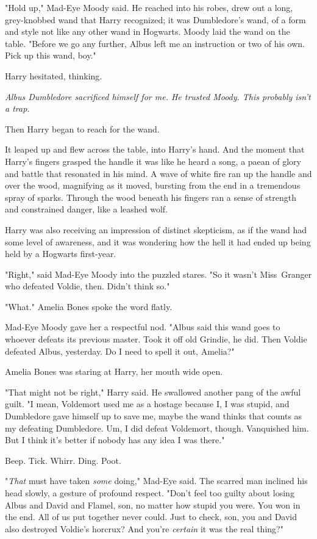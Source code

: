 "Hold up," Mad-Eye Moody said. He reached into his robes, drew out a long,
grey-knobbed wand that Harry recognized; it was Dumbledore's wand, of a form
and style not like any other wand in Hogwarts. Moody laid the wand on the
table. "Before we go any further, Albus left me an instruction or two of his
own. Pick up this wand, boy."

Harry hesitated, thinking.

\emph{Albus Dumbledore sacrificed himself for me. He trusted Moody. This
probably isn't a trap.}

Then Harry began to reach for the wand.

It leaped up and flew across the table, into Harry's hand. And the moment that
Harry's fingers grasped the handle it was like he heard a song, a paean of
glory and battle that resonated in his mind. A wave of white fire ran up the
handle and over the wood, magnifying as it moved, bursting from the end in a
tremendous spray of sparks. Through the wood beneath his fingers ran a sense of
strength and constrained danger, like a leashed wolf.

Harry was also receiving an impression of distinct skepticism, as if the wand
had some level of awareness, and it was wondering how the hell it had ended up
being held by a Hogwarts first-year.

"Right," said Mad-Eye Moody into the puzzled stares. "So it wasn't Miss~Granger
who defeated Voldie, then. Didn't think so."

"What." Amelia Bones spoke the word flatly.

Mad-Eye Moody gave her a respectful nod. "Albus said this wand goes to whoever
defeats its previous master. Took it off old Grindie, he did. Then Voldie
defeated Albus, yesterday. Do I need to spell it out, Amelia?"

Amelia Bones was staring at Harry, her mouth wide open.

"That might not be right," Harry said. He swallowed another pang of the awful
guilt. "I mean, Voldemort used me as a hostage because I, I was stupid, and
Dumbledore gave himself up to save me, maybe the wand thinks that counts as my
defeating Dumbledore. Um, I did defeat Voldemort, though. Vanquished him. But I
think it's better if nobody has any idea I was there."

Beep. Tick. Whirr. Ding. Poot.

"\emph{That} must have taken \emph{some} doing," Mad-Eye said. The scarred man
inclined his head slowly, a gesture of profound respect. "Don't feel too guilty
about losing Albus and David and Flamel, son, no matter how stupid you were.
You won in the end. All of us put together never could. Just to check, son, you
and David also destroyed Voldie's horcrux? And you're \emph{certain} it was the
real thing?"

